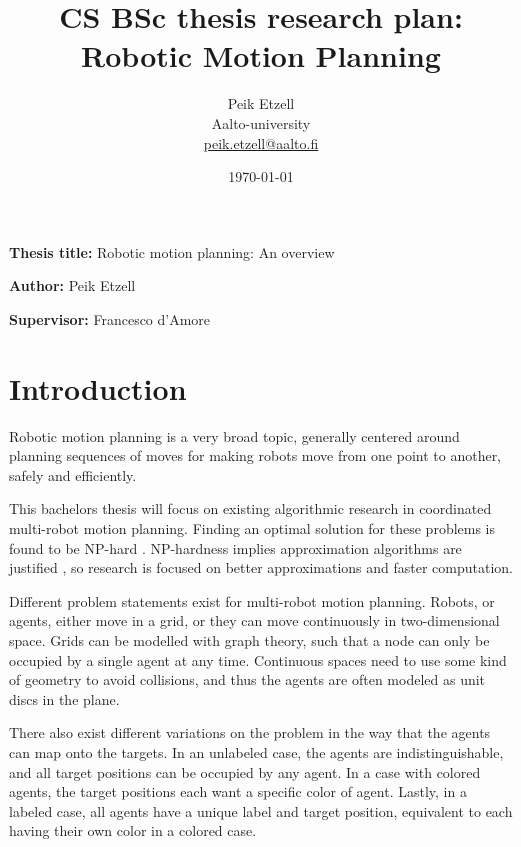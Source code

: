 \documentclass[12pt,a4paper,english,oneside]{article}
\begin{document}

\title{CS BSc thesis research plan:\\[5mm]
Robotic Motion Planning}

\author{Peik Etzell\\
Aalto-university\\
\url{peik.etzell@aalto.fi}}

\date{\today}

\maketitle


\vspace{10mm}

\textbf{Thesis title:} Robotic motion planning: An overview %

\textbf{Author:} Peik Etzell

\textbf{Supervisor:} Francesco d'Amore


\section{Introduction}

Robotic motion planning is a very broad topic, generally centered around planning sequences of moves for making robots move from one point to another, safely and efficiently. 

This bachelors thesis will focus on existing algorithmic research in coordinated multi-robot motion planning.
Finding an optimal solution for these problems is found to be NP-hard \cite{demaineCoordinatedMotionPlanning2019}. NP-hardness implies approximation algorithms are justified \cite{demaineCoordinatedMotionPlanning2019}, so research is focused on better approximations and faster computation. 

Different problem statements exist for multi-robot motion planning. Robots, or agents, either move in a grid, or they can move continuously in two-dimensional space. 
Grids can be modelled with graph theory, such that a node can only be occupied by a single agent at any time. 
Continuous spaces need to use some kind of geometry to avoid collisions, and thus the agents are often modeled as unit discs in the plane. 

There also exist different variations on the problem in the way that the agents can map onto the targets. In an unlabeled case, the agents are indistinguishable, and all target positions can be occupied by any agent. In a case with colored agents, the target positions each want a specific color of agent. Lastly, in a labeled case, all agents have a unique label and target position, equivalent to each having their own color in a colored case.
\end{document}
